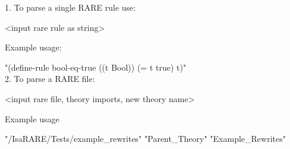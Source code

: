 \begin{isabellebody}
\begin{isamarkuptext}
1. To parse a single RARE rule use:

 <input rare rule as string> 

Example usage:

 "(define-rule bool-eq-true ((t Bool)) (= t true) t)"\\

2. To parse a RARE file:

 <input rare file, theory imports, new theory name>

Example usage

 "/IsaRARE/Tests/example\_rewrites" "Parent\_Theory" "Example\_Rewrites"


\end{isamarkuptext}
\end{isabellebody}
